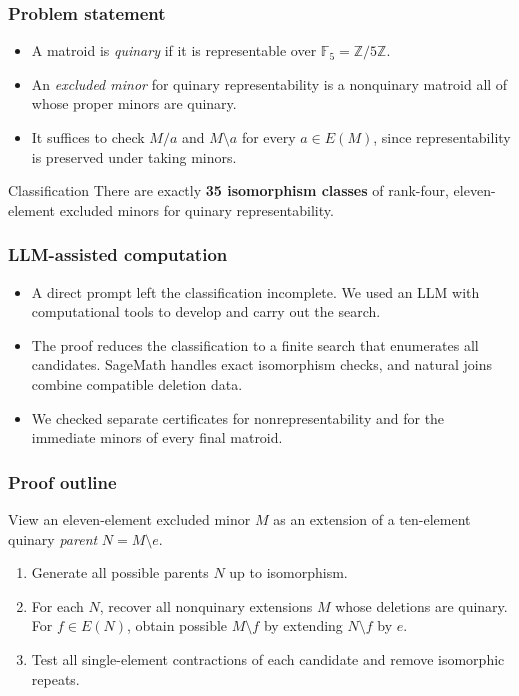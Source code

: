 \documentclass{beamer}
\newcommand{\F}{\mathbb{F}}
\begin{document}
\begin{frame}
  \frametitle{Problem statement}
  \begin{itemize}
    \item A matroid is \emph{quinary} if it is representable over
      $\F_5=\mathbb Z/5\mathbb Z$.
    \item An \emph{excluded minor} for quinary representability is a
      nonquinary matroid all of whose proper minors are quinary.
    \item It suffices to check $M/a$ and $M\setminus a$ for every
      $a\in E(M)$, since representability is preserved under taking minors.
  \end{itemize}
  \begin{block}{Classification}
    There are exactly \textbf{35 isomorphism classes} of rank-four,
    eleven-element excluded minors for quinary representability.
  \end{block}
\end{frame}

\begin{frame}
  \frametitle{LLM-assisted computation}
  \begin{itemize}
    \item A direct prompt left the classification incomplete. We used
      an LLM with computational tools to develop and carry out the search.
    \item The proof reduces the classification to a finite search that
      enumerates all candidates. SageMath handles exact isomorphism
      checks, and natural joins combine compatible deletion data.
    \item We checked separate certificates for nonrepresentability and
      for the immediate minors of every final matroid.
  \end{itemize}
\end{frame}

\begin{frame}
  \frametitle{Proof outline}
  View an eleven-element excluded minor $M$ as an extension of a
  ten-element quinary \emph{parent} $N=M\setminus e$.
  \begin{enumerate}
    \item Generate all possible parents $N$ up to isomorphism.
    \item For each $N$, recover all nonquinary extensions $M$ whose
      deletions are quinary. For $f\in E(N)$, obtain possible
      $M\setminus f$ by extending $N\setminus f$ by $e$.
    \item Test all single-element contractions of each candidate and
      remove isomorphic repeats.
  \end{enumerate}
\end{frame}
\end{document}
